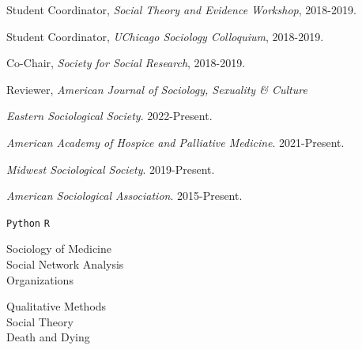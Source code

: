 \documentclass[11pt,article,oneside]{memoir}
\begin{document}
\ind Student Coordinator, \emph{Social Theory and Evidence Workshop}, 2018-2019.

\ind Student Coordinator, \emph{UChicago Sociology Colloquium}, 2018-2019.

\ind Co-Chair, \emph{Society for Social Research}, 2018-2019.

\ind Reviewer, \emph{American Journal of Sociology, Sexuality \& Culture}

\medskip
{}
\medskip

\ind \emph{Eastern Sociological Society}. 2022-Present.

\ind \emph{American Academy of Hospice and Palliative Medicine}. 2021-Present.

\ind \emph{Midwest Sociological Society}. 2019-Present.

\ind \emph{American Sociological Association}. 2015-Present.

\medskip
{}
\medskip

\ind  \texttt{Python} \hspace{0.4in}  \texttt{R} \hspace{0.4in}

\medskip
{}
\medskip

\vskip 16pt

\noindent\begin{minipage}{\textwidth}
	\begin{minipage}{0.5\textwidth}
	Sociology of Medicine \\ Social Network Analysis \\ Organizations
	\end{minipage}\hfill
	\begin{minipage}{0.5\textwidth}
	Qualitative Methods \\ Social Theory \\ Death and Dying
	\end{minipage}%
\end{minipage}
\end{document}
